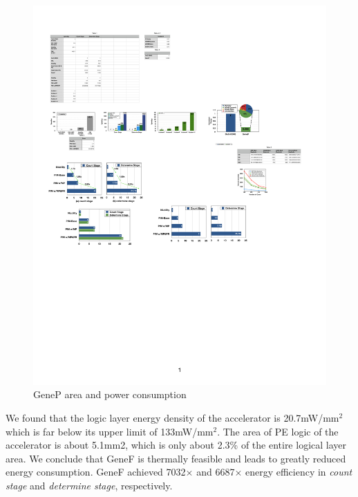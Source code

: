 \documentclass[9pt,conference]{IEEEtran}
\begin{document}
\begin{figure}[!htbp]
\centering
\includegraphics[scale=0.4]{fig/energy.pdf}
\caption{GeneP area and power consumption}
\label{fig:energy}
\end{figure}

We found that the logic layer energy density of the accelerator is 20.7mW/mm$^{2}$ which is far below its upper limit of 133mW/mm$^{2}$. The area of PE logic of the accelerator is about 5.1mm2, which is only about 2.3\% of the entire logical layer area. We conclude that GeneF is thermally feasible and leads to greatly reduced energy consumption. GeneF achieved 7032$\times$ and 6687$\times$ energy efficiency in \textit{count stage} and \textit{determine stage}, respectively.
\end{document}
